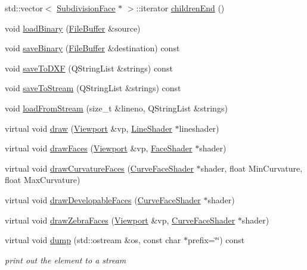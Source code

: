 \begin{DoxyCompactItemize}
\item 
std\+::vector$<$ \hyperlink{classShipCAD_1_1SubdivisionFace}{Subdivision\+Face} $\ast$ $>$\+::iterator \hyperlink{classShipCAD_1_1SubdivisionControlFace_acff2f413eceb70e345640c4519fb50bb}{children\+End} ()
\item 
void \hyperlink{classShipCAD_1_1SubdivisionControlFace_aa5ba43707787cde6e99cd645708e9200}{load\+Binary} (\hyperlink{classShipCAD_1_1FileBuffer}{File\+Buffer} \&source)
\item 
void \hyperlink{classShipCAD_1_1SubdivisionControlFace_ae457e09000f125b55fbabd0b847f5804}{save\+Binary} (\hyperlink{classShipCAD_1_1FileBuffer}{File\+Buffer} \&destination) const 
\item 
void \hyperlink{classShipCAD_1_1SubdivisionControlFace_afb041e8183a570059b354afb74d954c2}{save\+To\+D\+XF} (Q\+String\+List \&strings) const 
\item 
void \hyperlink{classShipCAD_1_1SubdivisionControlFace_aefdfafb7438853579979a1628b8522e7}{save\+To\+Stream} (Q\+String\+List \&strings) const 
\item 
void \hyperlink{classShipCAD_1_1SubdivisionControlFace_ae06e29e54f93c529875bbd66b32ad3e7}{load\+From\+Stream} (size\+\_\+t \&lineno, Q\+String\+List \&strings)
\item 
virtual void \hyperlink{classShipCAD_1_1SubdivisionControlFace_ac253493bccd91108d936b651e72b46f8}{draw} (\hyperlink{classShipCAD_1_1Viewport}{Viewport} \&vp, \hyperlink{classShipCAD_1_1LineShader}{Line\+Shader} $\ast$lineshader)
\item 
virtual void \hyperlink{classShipCAD_1_1SubdivisionControlFace_a45d5155a450040671ffba6cc691c79d7}{draw\+Faces} (\hyperlink{classShipCAD_1_1Viewport}{Viewport} \&vp, \hyperlink{classShipCAD_1_1FaceShader}{Face\+Shader} $\ast$shader)
\item 
virtual void \hyperlink{classShipCAD_1_1SubdivisionControlFace_a925866e18c4dddade1e77121f0b2dfb0}{draw\+Curvature\+Faces} (\hyperlink{classShipCAD_1_1CurveFaceShader}{Curve\+Face\+Shader} $\ast$shader, float Min\+Curvature, float Max\+Curvature)
\item 
virtual void \hyperlink{classShipCAD_1_1SubdivisionControlFace_a00c3b9ec166796a0d9f21f2054a2cafd}{draw\+Developable\+Faces} (\hyperlink{classShipCAD_1_1CurveFaceShader}{Curve\+Face\+Shader} $\ast$shader)
\item 
virtual void \hyperlink{classShipCAD_1_1SubdivisionControlFace_a0816cbcc14608e95b2013c80cad80bc8}{draw\+Zebra\+Faces} (\hyperlink{classShipCAD_1_1Viewport}{Viewport} \&vp, \hyperlink{classShipCAD_1_1CurveFaceShader}{Curve\+Face\+Shader} $\ast$shader)
\item 
virtual void \hyperlink{classShipCAD_1_1SubdivisionControlFace_a947868fba3e9bb6c587847fb9245c9ff}{dump} (std\+::ostream \&os, const char $\ast$prefix=\char`\"{}\char`\"{}) const 
\begin{DoxyCompactList}\small\item\em print out the element to a stream \end{DoxyCompactList}\end{DoxyCompactItemize}
